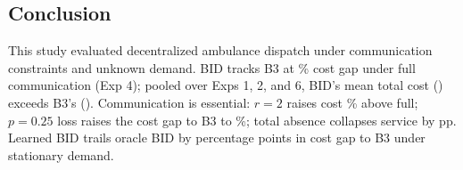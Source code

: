 \documentclass{article}
\begin{document}
\subsection{Conclusion}
This study evaluated decentralized ambulance dispatch under communication constraints and unknown demand. BID tracks B3 at \FullBIDCostGapPercent\% cost gap under full communication (Exp 4); pooled over Exps 1, 2, and 6, BID's mean total cost (\PooledBIDTotalCost) exceeds B3's (\PooledBThreeTotalCost). Communication is essential: $r=2$ raises cost \RadiusTwoCostIncPercent\% above full; $p=0.25$ loss raises the cost gap to B3 to \LossyBIDCostGapPercent\%; total absence collapses service by \FullNoneServiceDifferencePP{} pp. Learned BID trails oracle BID by \LearnedOracleGapDiffPP{} percentage points in cost gap to B3 under stationary demand.

{\footnotesize
\setlength{\bibsep}{0.5pt}


}
\end{document}
